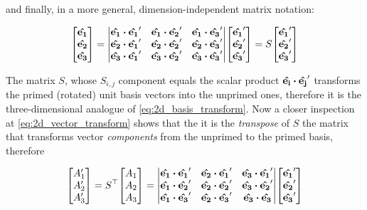 and finally, in a more general, dimension-independent matrix notation: 

\begin{equation}
\mqty[\vu{e_1} \\ \vu{e_2} \\ \vu{e_3}] = \mqty|  
\vu{e_1} \vdot \vu{e_1}' & \vu{e_1} \vdot \vu{e_2}' & \vu{e_1} \vdot \vu{e_3}' \\
\vu{e_2} \vdot \vu{e_1}' & \vu{e_2} \vdot \vu{e_2}' & \vu{e_2} \vdot \vu{e_3}' \\
\vu{e_3} \vdot \vu{e_1}' & \vu{e_3} \vdot \vu{e_2}' & \vu{e_3} \vdot \vu{e_3}' |
\mqty[\vu{e_1}' \\ \vu{e_2}' \\ \vu{e_3}']
= S \mqty[\vu{e_1}' \\ \vu{e_2}' \\ \vu{e_3}']
\label{eq:3d_basis_transform}
\end{equation}

The matrix $S$, whose $S_{i,j}$ component equals the scalar product $\vu{e_i} \vdot \vu{e_j}'$ transforms the primed (rotated) unit basis vectors into the unprimed ones, therefore it is the three-dimensional analogue of \ref{eq:2d_basis_transform}. Now a closer inspection at \ref{eq:2d_vector_transform} shows that the it is the \textit{transpose} of $S$ the matrix that transforms vector \textit{components} from the unprimed to the primed basis, therefore

\begin{equation}
\mqty[A_1' \\ A_2' \\ A_3'] = S^\top \mqty[A_1 \\ A_2 \\ A_3] = \mqty|
\vu{e_1} \vdot \vu{e_1}' & \vu{e_2} \vdot \vu{e_1}' & \vu{e_3} \vdot \vu{e_1}' \\
\vu{e_1} \vdot \vu{e_2}' & \vu{e_2} \vdot \vu{e_2}' & \vu{e_3} \vdot \vu{e_2}' \\
\vu{e_1} \vdot \vu{e_3}' & \vu{e_2} \vdot \vu{e_3}' & \vu{e_3} \vdot \vu{e_3}  |
\mqty[\vu{e_1}' \\ \vu{e_2}' \\ \vu{e_3}']
\label{eq:3d_components_transform}
\end{equation}

